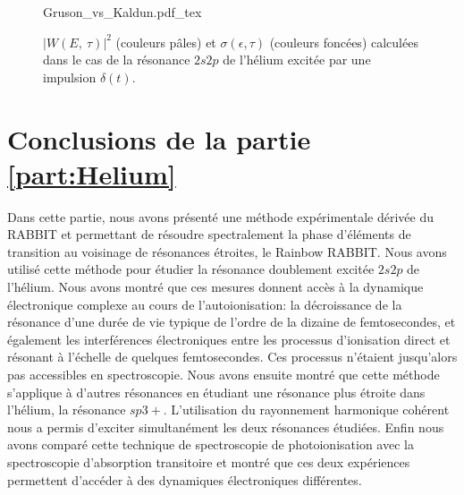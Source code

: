 \begin{figure}
\centering
\def\svgwidth{0.8\textwidth}
{Gruson_vs_Kaldun.pdf_tex}
\caption{$|W(E, \:  \tau)|^2$ (couleurs pâles) et $\sigma(\epsilon,\tau)$ (couleurs foncées) calculées dans le cas de la résonance $2s2p$ de l'hélium excitée par une impulsion $\delta(t)$.}
\label{fig:Gruson_vs_Kaldun}
\end{figure}

\section*{Conclusions de la partie \ref{part:Helium}}
Dans cette partie, nous avons présenté une méthode expérimentale dérivée du RABBIT et permettant de résoudre spectralement la phase d'éléments de transition au voisinage de résonances étroites, le Rainbow RABBIT. Nous avons utilisé cette méthode pour étudier la résonance doublement excitée $2s2p$ de l'hélium. Nous avons montré que ces mesures donnent accès à la dynamique électronique complexe au cours de l'autoionisation: la décroissance de la résonance d'une durée de vie typique de l'ordre de la dizaine de femtosecondes, et également les interférences électroniques entre les processus d'ionisation direct et résonant à l'échelle de quelques femtosecondes. Ces processus n'étaient jusqu'alors pas accessibles en spectroscopie. Nous avons ensuite montré que cette méthode s'applique à d'autres résonances en étudiant une résonance plus étroite dans l'hélium, la résonance $sp3+$. L'utilisation du rayonnement harmonique cohérent nous a permis d'exciter simultanément les deux résonances étudiées. Enfin nous avons comparé cette technique de spectroscopie de photoionisation avec la spectroscopie d'absorption transitoire et montré que ces deux expériences permettent d'accéder à des dynamiques électroniques différentes.

